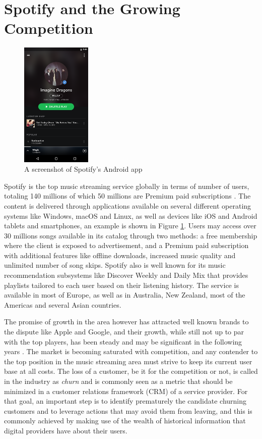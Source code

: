 \documentclass{kththesis}
\begin{document}
	\section{Spotify and the Growing Competition}	
	
	\begin{figure}[h]
    \centering
    \includegraphics[width=0.3\textwidth, natwidth=506bp, natheight=900bp]{figures/spotify_screenshot.png}
    \caption{A screenshot of Spotify's Android app}
    \label{fig:spotify-screenshot}
\end{figure}
		
	Spotify is the top music streaming service globally in terms of number of users, totaling 140 millions of which 50 millions are Premium paid subscriptions \citep{spotifypress}. The content is delivered through applications available on several different operating systems like Windows, macOS and Linux, as well as devices like iOS and Android tablets and smartphones, an example is shown in Figure \ref{fig:spotify-screenshot}. Users may access over 30 millions songs available in its catalog through two methods: a free membership where the client is exposed to advertisement, and a Premium paid subscription with additional features like offline downloads, increased music quality and unlimited number of song skips. Spotify also is well known for its music recommendation subsystems like Discover Weekly and Daily Mix that provides playlists tailored to each user based on their listening history. The service is available in most of Europe, as well as in Australia, New Zealand, most of the Americas and several Asian countries.	
	
	The promise of growth in the area however has attracted well known brands to the dispute like Apple and Google, and their growth, while still not up to par with the top players, has been steady and may be significant in the following years \citep{ifpi}. The market is becoming saturated with competition, and any contender to the top position in the music streaming area must strive to keep its current user base at all costs. The loss of a customer, be it for the competition or not, is called in the industry as \emph{churn} and is commonly seen as a metric that should be minimized in a customer relations framework (CRM) of a service provider. For that goal, an important step is to identify prematurely the candidate churning customers and to leverage actions that may avoid them from leaving, and this is commonly achieved by making use of the wealth of historical information that digital providers have about their users. 
	
\end{document}
